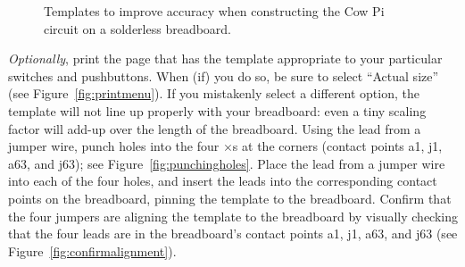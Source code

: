 \begin{figure}[p]
    \vspace{.5in}
    \caption{Templates to improve accuracy when constructing the Cow Pi circuit on a solderless breadboard.}\label{fig:templates}%
\end{figure}

\textit{Optionally}, print the page that has the template appropriate to your particular switches and pushbuttons.
When (if) you do so, be sure to select ``Actual size'' (see Figure~\ref{fig:printmenu}).
If you mistakenly select a different option, the template will not line up properly with your breadboard: even a tiny scaling factor will add-up over the length of the breadboard.
Using the lead from a jumper wire, punch holes into the four $\times$s at the corners (contact points a1, j1, a63, and j63); see Figure~\ref{fig:punchingholes}.
Place the lead from a jumper wire into each of the four holes, and insert the leads into the corresponding contact points on the breadboard, pinning the template to the breadboard.
Confirm that the four jumpers are aligning the template to the breadboard by visually checking that the four leads are in the breadboard's contact points a1, j1, a63, and j63 (see Figure~\ref{fig:confirmalignment}).

